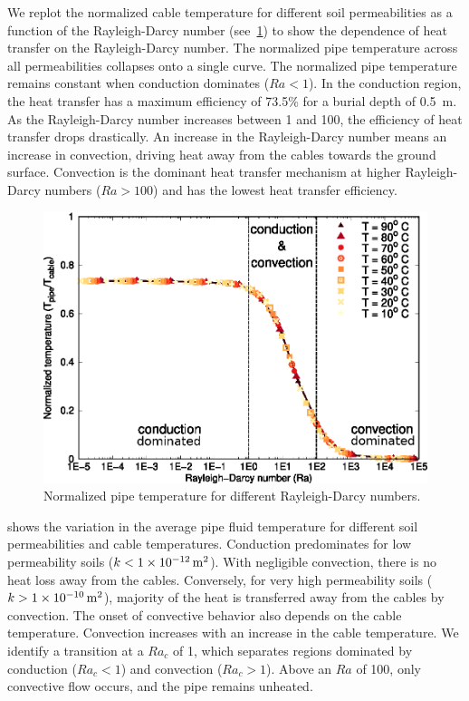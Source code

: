 \documentclass[Journal,letterpaper,InsideFigs]{ascelike-new}
\begin{document}
We replot the normalized cable temperature for different soil permeabilities as a function of the Rayleigh-Darcy number (see~\cref{fig:ra-temp}) to show the dependence of heat transfer on the Rayleigh-Darcy number. The normalized pipe temperature across all permeabilities collapses onto a single curve. The normalized pipe temperature remains constant when conduction dominates ($Ra < 1$). In the conduction region, the heat transfer has a maximum efficiency of 73.5\% for a burial depth of \SI{0.5}{\meter}. As the Rayleigh-Darcy number increases between 1 and 100, the efficiency of heat transfer drops drastically. An increase in the Rayleigh-Darcy number means an increase in convection, driving heat away from the cables towards the ground surface. Convection is the dominant heat transfer mechanism at higher Rayleigh-Darcy numbers ($Ra > 100$) and has the lowest heat transfer efficiency. 

\begin{figure}
    \centering
    \includegraphics{figs/ra-dt.eps}
    \caption{Normalized pipe temperature for different Rayleigh-Darcy numbers.}
    \label{fig:ra-temp}
\end{figure}

 shows the variation in the average pipe fluid temperature for different soil permeabilities and cable temperatures. Conduction predominates for low permeability soils ($k < \SI{1E-12}{\meter\squared}$). With negligible convection, there is no heat loss away from the cables. Conversely, for very high permeability soils ($k > \SI{1E-10}{\meter\squared}$), majority of the heat is transferred away from the cables by convection. The onset of convective behavior also depends on the cable temperature. Convection increases with an increase in the cable temperature. We identify a transition at a $Ra_c$ of 1, which separates regions dominated by conduction ($Ra_c < 1$) and convection ($Ra_c > 1$). Above an $Ra$ of 100, only convective flow occurs, and the pipe remains unheated. 
\end{document}
